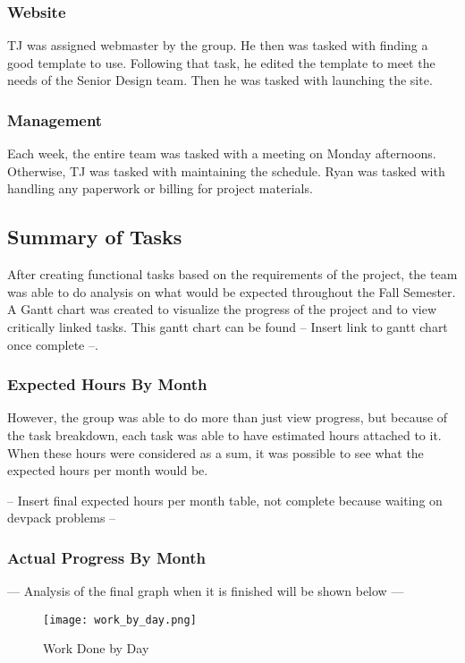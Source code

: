 \documentclass[PPFS.tex]{template/subfiles}
\begin{document}
\subsubsection{Website}
TJ was assigned webmaster by the group. He then was tasked with finding a good template to use. Following that task, he edited the template to meet the needs of the Senior Design team. Then he was tasked with launching the site.

\subsubsection{Management}
Each week, the entire team was tasked with a meeting on Monday afternoons. Otherwise, TJ was tasked with maintaining the schedule. Ryan was tasked with handling any paperwork or billing for project materials.


\subsection{Summary of Tasks}
After creating functional tasks based on the requirements of the project, the team was able to do analysis on what would be expected throughout the Fall Semester. A Gantt chart was created to visualize the progress of the project and to view critically linked tasks.
This gantt chart can be found -- Insert link to gantt chart once complete --.

\subsubsection{Expected Hours By Month}
However, the group was able to do more than just view progress, but because of the task breakdown, each task was able to have estimated hours attached to it. When these hours were considered as a sum, it was possible to see what the expected hours per month would be.

-- Insert final expected hours per month table, not complete because waiting on devpack problems  --

\subsubsection{Actual Progress By Month}

--- Analysis of the final graph when it is finished will be shown below ---

\begin{figure}[H]
    \centering
    \texttt{[image: work\_by\_day.png]}
    \caption{Work Done by Day}
\end{figure}
\end{document}
